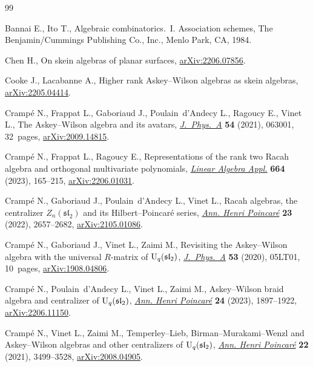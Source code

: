 \begin{thebibliography}{99}
\footnotesize\itemsep=0pt

Bannai E., Ito T., Algebraic combinatorics.~{I}. Association schemes, The
 Benjamin/Cummings Publishing Co., Inc., Menlo Park, CA, 1984.

Chen H., On skein algebras of planar surfaces, \href{https://arxiv.org/abs/2206.07856}{arXiv:2206.07856}.

Cooke J., Lacabanne A., Higher rank {A}skey--{W}ilson algebras as skein
 algebras, \href{https://arxiv.org/abs/2205.04414}{arXiv:2205.04414}.

Cramp\'e N., Frappat L., Gaboriaud J., Poulain~d'Andecy L., Ragoucy E., Vinet L., The
 {A}skey--{W}ilson algebra and its avatars, \href{https://doi.org/10.1088/1751-8121/abd783}{\textit{J.~Phys.~A}} \textbf{54}
 (2021), 063001, 32~pages, \href{https://arxiv.org/abs/2009.14815}{arXiv:2009.14815}.

Cramp\'e N., Frappat L., Ragoucy E., Representations of the rank two {R}acah
 algebra and orthogonal multivariate polynomials, \href{https://doi.org/10.1016/j.laa.2023.01.017}{\textit{Linear Algebra
 Appl.}} \textbf{664} (2023), 165--215, \href{https://arxiv.org/abs/2206.01031}{arXiv:2206.01031}.

Cramp\'e N., Gaboriaud J., Poulain~d'Andecy L., Vinet L., Racah algebras, the
 centralizer {$Z_n(\mathfrak{sl}_2)$} and its {H}ilbert--{P}oincar\'e series,
 \href{https://doi.org/10.1007/s00023-021-01152-y}{\textit{Ann. Henri Poincar\'e}} \textbf{23} (2022), 2657--2682,
 \href{https://arxiv.org/abs/2105.01086}{arXiv:2105.01086}.

Cramp\'e N., Gaboriaud J., Vinet L., Zaimi M., Revisiting the {A}skey--{W}ilson
 algebra with the universal {$R$}-matrix of {${\rm U}_q(\mathfrak{sl}_2)$},
 \href{https://doi.org/10.1088/1751-8121/ab604e}{\textit{J.~Phys.~A}} \textbf{53} (2020), 05LT01, 10~pages,
 \href{https://arxiv.org/abs/1908.04806}{arXiv:1908.04806}.

Cramp\'e N., Poulain~d'Andecy L., Vinet L., Zaimi M., Askey--{W}ilson braid
 algebra and centralizer of {${\rm U}_q(\mathfrak{sl}_2)$}, \href{https://doi.org/10.1007/s00023-023-01275-4}{\textit{Ann. Henri
 Poincar\'e}} \textbf{24} (2023), 1897--1922, \href{https://arxiv.org/abs/2206.11150}{arXiv:2206.11150}.

Cramp\'e N., Vinet L., Zaimi M., Temperley--{L}ieb,
 {B}irman--{M}urakami--{W}enzl and {A}skey--{W}ilson algebras and other
 centralizers of {${\rm U}_q(\mathfrak{sl}_2)$}, \href{https://doi.org/10.1007/s00023-021-01064-x}{\textit{Ann. Henri Poincar\'e}}
 \textbf{22} (2021), 3499--3528, \href{https://arxiv.org/abs/2008.04905}{arXiv:2008.04905}.


\end{thebibliography}
